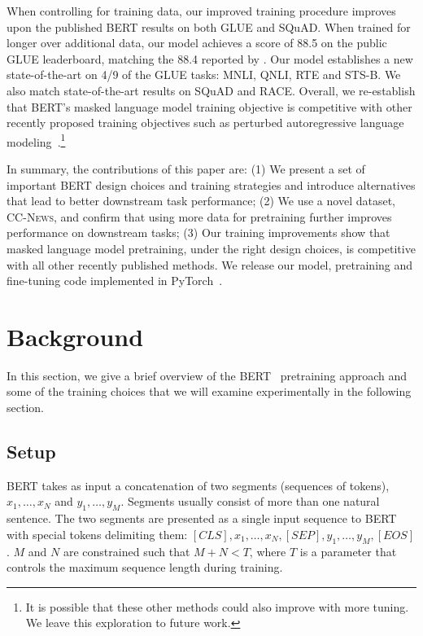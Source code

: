 When controlling for training data, our improved training procedure improves upon the published BERT results on both GLUE and SQuAD. When trained for longer over additional data, our model achieves a score of 88.5 on the public GLUE leaderboard, matching the 88.4 reported by .
Our model establishes a new state-of-the-art on 4/9 of the GLUE tasks: MNLI, QNLI, RTE and STS-B. We also match state-of-the-art results on SQuAD and RACE. Overall, we re-establish that BERT's masked language model training objective is competitive with other recently proposed training objectives such as perturbed autoregressive language modeling~\cite{yang2019xlnet}.\footnote{It is possible that these other methods could also improve with more tuning. We leave this exploration to future work.}

In summary, the contributions of this paper are: (1) We present a set of important BERT design choices and training strategies and introduce alternatives that lead to better downstream task performance; (2) We use a novel dataset, \textsc{CC-News}, and confirm that using more data for pretraining further improves performance on downstream tasks; (3) Our training improvements show that masked language model pretraining, under the right design choices, is competitive with all other recently published methods. We release our model, pretraining and fine-tuning code implemented in PyTorch~\cite{paszke2017automatic}.

\section{Background} \label{sec:background}

In this section, we give a brief overview of the BERT~\cite{devlin2018bert} pretraining approach and some of the training choices that we will examine experimentally in the following section.

\subsection{Setup}
BERT takes as input a concatenation of two segments (sequences of tokens), $x_1 , \ldots , x_N$ and $y_1 , \ldots , y_M$. Segments usually consist of more than one natural sentence. The two segments are presented as a single input sequence to BERT with special tokens delimiting them: $[\mathit{CLS}], x_1 , \ldots , x_N, [\mathit{SEP}], y_1 , \ldots , y_M, [\mathit{EOS}]$.
$M$ and $N$ are constrained such that $M + N < T$, where $T$ is a parameter that controls the maximum sequence length during training.

